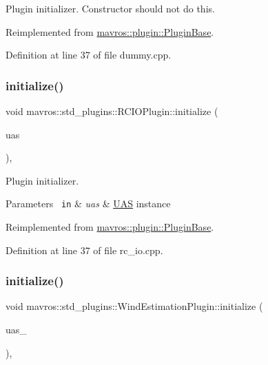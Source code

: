 Plugin initializer. Constructor should not do this. 

Reimplemented from \mbox{\hyperlink{group__plugin_gad5313a41da4d26acbbabf008cdc21e82}{mavros\+::plugin\+::\+Plugin\+Base}}.



Definition at line 37 of file dummy.\+cpp.

\mbox{\label{group__plugin_ga96ac58aa9a228dc59d676fdde7909bf5}} 
\subsubsection{\texorpdfstring{initialize()}{initialize()}\hspace{0.1cm}{\footnotesize\ttfamily [14/41]}}
{\footnotesize\ttfamily void mavros\+::std\+\_\+plugins\+::\+R\+C\+I\+O\+Plugin\+::initialize (\begin{DoxyParamCaption}\item[{\mbox{\hyperlink{classmavros_1_1UAS}{U\+AS}} \&}]{uas }\end{DoxyParamCaption})\hspace{0.3cm}{\ttfamily [inline]}, {\ttfamily [virtual]}}



Plugin initializer. 


\begin{DoxyParams}[1]{Parameters}
\mbox{\texttt{ in}}  & {\em uas} & {\ttfamily \mbox{\hyperlink{classmavros_1_1UAS}{U\+AS}}} instance \\
\hline
\end{DoxyParams}


Reimplemented from \mbox{\hyperlink{group__plugin_gad5313a41da4d26acbbabf008cdc21e82}{mavros\+::plugin\+::\+Plugin\+Base}}.



Definition at line 37 of file rc\+\_\+io.\+cpp.

\mbox{\label{group__plugin_ga6811f85521065b479c973b2d82353927}} 
\subsubsection{\texorpdfstring{initialize()}{initialize()}\hspace{0.1cm}{\footnotesize\ttfamily [15/41]}}
{\footnotesize\ttfamily void mavros\+::std\+\_\+plugins\+::\+Wind\+Estimation\+Plugin\+::initialize (\begin{DoxyParamCaption}\item[{\mbox{\hyperlink{classmavros_1_1UAS}{U\+AS}} \&}]{uas\+\_\+ }\end{DoxyParamCaption})\hspace{0.3cm}{\ttfamily [inline]}, {\ttfamily [virtual]}}

